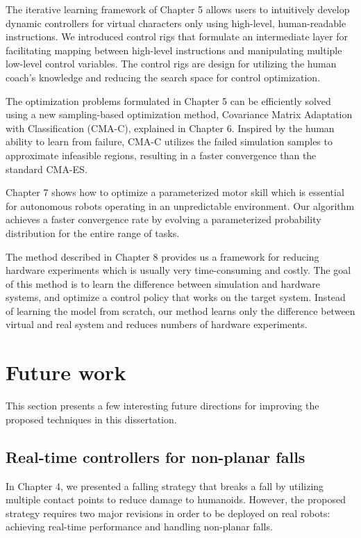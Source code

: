 The iterative learning framework of Chapter 5 allows users to intuitively
develop dynamic controllers for virtual characters only using high-level,
human-readable instructions.
We introduced control rigs that
formulate an intermediate layer 
for facilitating mapping between high-level instructions and manipulating
multiple low-level control variables.
The control rigs are design for utilizing the human coach's knowledge and 
reducing the search space for control optimization.

The optimization problems formulated in Chapter 5 can be efficiently solved
using a new sampling-based optimization method, Covariance Matrix
Adaptation with Classification (CMA-C), explained in Chapter 6.
Inspired by the human ability to learn from failure,
CMA-C utilizes the failed simulation samples to approximate infeasible regions,
resulting in a faster convergence than the standard CMA-ES.

Chapter 7 shows how to optimize a parameterized motor skill which
is essential for autonomous robots operating in an unpredictable environment.
Our algorithm achieves a faster convergence rate by evolving a parameterized
probability distribution for the entire range of tasks.

The method described in Chapter 8 provides us a framework for reducing hardware
experiments which is usually very time-consuming and costly.
The goal of this method is to learn the difference between simulation and
hardware systems, and optimize a control policy that works on the target system.
Instead of learning the model from scratch, our method learns only the
difference between virtual and real system and reduces
numbers of hardware experiments.

\section{Future work}
This section presents a few interesting future directions for improving the
proposed techniques in this dissertation.

\subsection{Real-time controllers for non-planar falls}
In Chapter 4, we presented a falling strategy that breaks a fall by
utilizing multiple contact points to reduce damage to humanoids.
However, the proposed strategy requires two major revisions in order to be
deployed on real robots: achieving real-time performance and handling
non-planar falls. 

